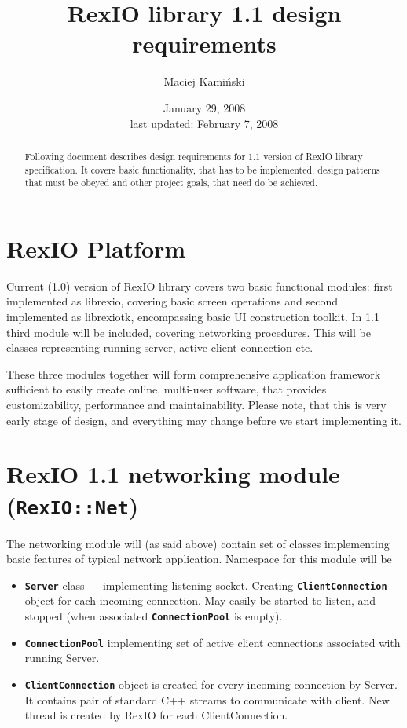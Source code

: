 \documentclass[11pt,a4paper]{article}
\date{January 29, 2008\\last updated: February 7, 2008}
\author{Maciej Kamiński}
\title{RexIO library 1.1 design requirements}
\newcommand{\Class}[1]{\texttt{\textbf{#1}}}
\begin{document}
\maketitle

\begin{abstract}
  Following document describes design requirements for 1.1 version of
  RexIO library specification. It covers basic functionality, that has
  to be implemented, design patterns that must be obeyed and other
  project goals, that need do be achieved. 
\end{abstract}

\section{RexIO Platform}

Current (1.0) version of RexIO library covers two basic functional
modules: first implemented as librexio, covering basic screen operations
and second implemented as librexiotk, encompassing basic UI
construction toolkit. In 1.1 third module will be included, covering
networking procedures. This will be classes representing running
server, active client connection etc.

These three modules together will form comprehensive application
framework sufficient to easily create online, multi-user software,
that provides  customizability,  performance and 
maintainability. Please note, that this is very early stage of design,
and everything may change before we start implementing it.

\section{RexIO 1.1 networking module (\texttt{RexIO::Net})}

The networking module will (as said above) contain set of classes
implementing basic features of typical network application. Namespace
for this module will be 

\begin{itemize}
\item \Class{Server} class --- implementing listening
  socket. Creating \Class{ClientConnection} object for each incoming
  connection. May easily be started to listen, and stopped (when
  associated \Class{ConnectionPool} is empty).
\item \Class{ConnectionPool} implementing set of active client connections
  associated with running Server.
\item \Class{ClientConnection} object is created for every incoming
  connection by Server. It contains pair of standard C++ streams to
  communicate with client. New thread is created by RexIO for each
  ClientConnection.
\end{itemize}
\end{document}
